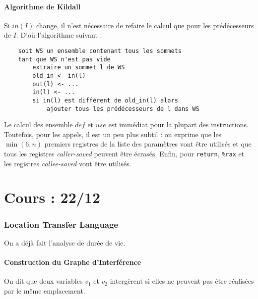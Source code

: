 \documentclass{cours}
\begin{document}
\subsection{Algorithme de Kildall}
Si $in(I)$ change, il n'est nécessaire de refaire le calcul que pour les prédécesseurs de $I$.  D'où l'algorithme suivant :
\begin{verbatim}
    soit WS un ensemble contenant tous les sommets
    tant que WS n'est pas vide
        extraire un sommet l de WS
        old_in <- in(l)
        out(l) <- ...
        in(l) <- ...
        si in(l) est différent de old_in(l) alors
            ajouter tous les prédécesseurs de l dans WS
\end{verbatim}

Le calcul des ensemble $def$ et $use$ est immédiat pour la plupart des instructions. Toutefois, pour les appels, il est un peu plus subtil : on exprime que les $\min(6, n)$ premiers registres de la liste des paramètres vont être utilisés et que tous les registres \textit{caller-saved} peuvent être écrasés. Enfin, pour \texttt{return}, \texttt{\%rax} et les registres \textit{callee-saved} vont être utilisés.

\part[Compilateur Optimisant II]{Cours : 22/12}
\section{Location Transfer Language}
On a déjà fait l'analyse de durée de vie.
\subsection{Construction du Graphe d'Interférence}
\begin{definition}
    On dit que deux variables $v_{1}$ et $v_{2}$ intergèrent si elles ne peuvent pas être réalisées par le même emplacement.
\end{definition}
\end{document}
